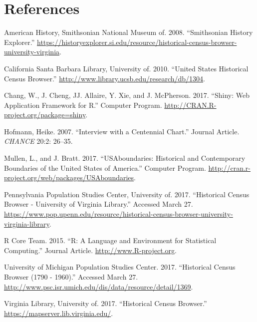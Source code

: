 \documentclass[11pt,]{article}
\begin{document}
\section{References}

\hypertarget{refs}{}
\hypertarget{ref-SmithsonianHistoryExplorer}{}
American History, Smithsonian National Museum of. 2008. ``Smithsonian
History Explorer.''
\url{https://historyexplorer.si.edu/resource/historical-census-browser-university-virginia}.

\hypertarget{ref-UCSB-US-HCB}{}
California Santa Barbara Library, University of. 2010. ``United States
Historical Census Browser.''
\url{http://www.library.ucsb.edu/research/db/1304}.

\hypertarget{ref-Shiny}{}
Chang, W., J. Cheng, JJ. Allaire, Y. Xie, and J. McPherson. 2017.
``Shiny: Web Application Framework for R.'' Computer Program.
\url{http://CRAN.R-project.org/package=shiny}.

\hypertarget{ref-ChartInterview}{}
Hofmann, Heike. 2007. ``Interview with a Centennial Chart.'' Journal
Article. \emph{CHANCE} 20:2: 26--35.

\hypertarget{ref-USAboundaries}{}
Mullen, L., and J. Bratt. 2017. ``USAboundaries: Historical and
Contemporary Boundaries of the United States of America.'' Computer
Program. \url{http://cran.r-project.org/web/packages/USAboundaries}.

\hypertarget{ref-UPenn-HCB}{}
Pennsylvania Population Studies Center, University of. 2017.
``Historical Census Browser - University of Virginia Library.'' Accessed
March 27.
\url{https://www.pop.upenn.edu/resource/historical-census-browser-university-virginia-library}.

\hypertarget{ref-RCoreTeam}{}
R Core Team. 2015. ``R: A Language and Environment for Statistical
Computing.'' Journal Article. \url{http://www.R-project.org}.

\hypertarget{ref-UMich-HCB}{}
University of Michigan Population Studies Center. 2017. ``Historical
Census Browser (1790 - 1960).'' Accessed March 27.
\url{http://www.psc.isr.umich.edu/dis/data/resource/detail/1369}.

\hypertarget{ref-HCB}{}
Virginia Library, University of. 2017. ``Historical Census Browser.''
\url{https://mapserver.lib.virginia.edu/}.
\end{document}
